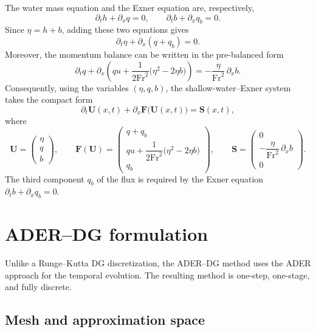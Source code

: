 \documentclass[11pt]{article}
\begin{document}
The water mass equation and the Exner equation are, respectively,
\[
    \partial_t h+\partial_x q=0,
    \qquad
    \partial_t b+\partial_x q_b=0.
\]
Since \(\eta=h+b\), adding these two equations gives
\[
    \partial_t\eta+\partial_x(q+q_b)=0.
\]
Moreover, the momentum balance can be written in the pre-balanced form
\[
    \partial_t q
    +\partial_x\!\left(
        qu+\frac{1}{2\mathrm{Fr}^2}\bigl(\eta^2-2\eta b\bigr)
    \right)
    =-\frac{\eta}{\mathrm{Fr}^2}\,\partial_x b.
\]
Consequently, using the variables \((\eta,q,b)\), the shallow-water--Exner system takes the
compact form
\begin{equation}
    \partial_t\bm U(x,t)+\partial_x\bm F\bigl(\bm U(x,t)\bigr)
    =\bm S(x,t),
    \tag{6}
    \label{eq:exner-system}
\end{equation}
where
\[
    \bm U=
    \begin{pmatrix}
        \eta\\ q\\ b
    \end{pmatrix},
    \qquad
    \bm F(\bm U)=
    \begin{pmatrix}
        q+q_b\\[1mm]
        qu+\dfrac{1}{2\mathrm{Fr}^2}\bigl(\eta^2-2\eta b\bigr)\\[1mm]
        q_b
    \end{pmatrix},
    \qquad
    \bm S=
    \begin{pmatrix}
        0\\[1mm]
        -\dfrac{\eta}{\mathrm{Fr}^2}\,\partial_x b\\[1mm]
        0
    \end{pmatrix}.
\]
The third component \(q_b\) of the flux is required by the Exner equation
\(\partial_t b+\partial_x q_b=0\).

\section{ADER--DG formulation}

Unlike a Runge--Kutta DG discretization, the ADER--DG method uses the ADER
approach for the temporal evolution. The resulting method is one-step,
one-stage, and fully discrete.

\subsection{Mesh and approximation space}
\end{document}
